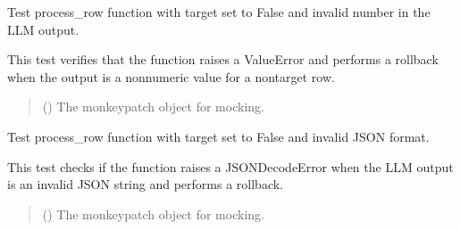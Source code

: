 \documentclass[letterpaper,10pt,english]{sphinxmanual}
\begin{document}
\begin{fulllineitems}
\label{\detokenize{test.data_storage:test.data_storage.test_llm_analyse.test_process_row_nontarget_invalid_number}}
\pysigstartsignatures
\pysiglinewithargsret
{}
{}
{}
\pysigstopsignatures
\sphinxAtStartPar
Test process\_row function with target set to False and invalid number in the LLM output.

\sphinxAtStartPar
This test verifies that the function raises a ValueError and performs a rollback when
the output is a non\sphinxhyphen{}numeric value for a non\sphinxhyphen{}target row.
\begin{quote}\begin{description}
\sphinxAtStartPar
{} () \textendash{} The monkeypatch object for mocking.

\end{description}\end{quote}

\end{fulllineitems}


\begin{fulllineitems}
\label{\detokenize{test.data_storage:test.data_storage.test_llm_analyse.test_process_row_nontarget_json_error}}
\pysigstartsignatures
\pysiglinewithargsret
{}
{}
{}
\pysigstopsignatures
\sphinxAtStartPar
Test process\_row function with target set to False and invalid JSON format.

\sphinxAtStartPar
This test checks if the function raises a JSONDecodeError when the LLM output is
an invalid JSON string and performs a rollback.
\begin{quote}\begin{description}
\sphinxAtStartPar
{} () \textendash{} The monkeypatch object for mocking.

\end{description}\end{quote}

\end{fulllineitems}
\end{document}
